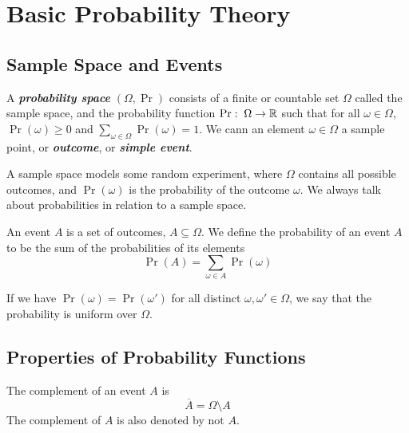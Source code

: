 \section{Basic Probability Theory}

\subsection{Sample Space and Events}

\vspace{\parskip}

\begin{definition}    
    A \textit{\textbf{probability space}} $(\Omega, \Pr)$ consists of a finite or countable set $\Omega$ called the sample space, and the probability function $\Pr:\; \Omega \to \mathbb{R}$ such that for all $\omega \in \Omega$, $\Pr(\omega) \geq 0$ and $\sum_{\omega \in \Omega} \Pr(\omega) = 1$. We cann an element $\omega \in \Omega$ a sample point, or \textit{\textbf{outcome}}, or \textit{\textbf{simple event}}.
\end{definition}

A sample space models some random experiment, where $\Omega$ contains all possible outcomes, and $\Pr(\omega)$ is the probability of the outcome $\omega$. We always talk about probabilities in relation to a sample space.

\begin{definition}[Event]
    An event $A$ is a set of outcomes, $A \subseteq \Omega$. We define the probability of an event $A$ to be the sum of the probabilities of its elements
    $$
    \Pr(A) = \sum_{\omega \in A} \Pr(\omega)
    $$ 
\end{definition}

If we have $\Pr(\omega) = \Pr(\omega')$ for all distinct $\omega, \omega' \in \Omega$, we say that the probability is uniform over $\Omega$.

\subsection{Properties of Probability Functions}

\vspace{\parskip}

\begin{definition}[Complement]
    The complement of an event $A$ is
    $$
    \overline{A} = \Omega \setminus A
    $$
    The complement of $A$ is also denoted by $\text{not }A$. 
\end{definition}

